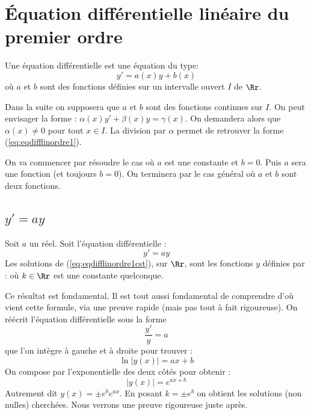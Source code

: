 \documentclass[class=report,crop=false]{standalone}
\begin{document}
\section{Équation différentielle linéaire du premier ordre}

\begin{definition}
Une équation différentielle  est une équation du type:
\begin{equation}
  y'=a(x)y + b(x)
  \label{eq:eqdifflinordre1}
  \tag{$E$}
\end{equation}
où $a$ et $b$ sont des fonctions définies sur un intervalle ouvert $I$ de $\Rr$.
\end{definition}


Dans la suite on supposera que $a$ et $b$ sont des fonctions continues sur $I$.
On peut envisager la forme :
$\alpha (x)y'+\beta (x)y=\gamma (x)$.
On demandera alors que $\alpha (x)\neq 0$ pour tout $x\in I$.
La division par $\alpha $ permet de retrouver la forme (\ref{eq:eqdifflinordre1}).

\bigskip

On va commencer par résoudre le cas où $a$ est une constante et $b=0$.
Puis $a$ sera une fonction (et toujours $b=0$).
On terminera par le cas général où $a$ et $b$ sont deux fonctions.

\subsection{$y'=ay$}

\begin{theoreme}
\label{th:eqdifflinordre1cst}
Soit $a$ un réel. Soit l'équation différentielle :
\begin{equation}
   y' = a y
  \label{eq:eqdifflinordre1cst}
  \tag{$E$}
\end{equation}
Les solutions de (\ref{eq:eqdifflinordre1cst}), sur $\Rr$, sont les fonctions $y$ définies par :
où $k\in \Rr$ est une constante quelconque.
\end{theoreme}


Ce résultat est fondamental. Il est tout aussi fondamental de
comprendre d'où vient cette formule, via une preuve rapide
(mais pas tout à fait rigoureuse). On réécrit l'équation
différentielle sous la forme
$$\frac{y'}{y} =  a$$
que l'on intègre à gauche et à droite pour trouver :
$$\ln |y(x)| = ax+b$$
On compose par l'exponentielle des deux côtés pour obtenir :
$$|y(x)| = e^{ax+b}$$
Autrement dit  $y(x) = \pm e^b e^{ax}$.
En posant $k = \pm e^b$ on obtient les solutions (non nulles) cherchées.
Nous verrons une preuve rigoureuse juste après.
\end{document}
